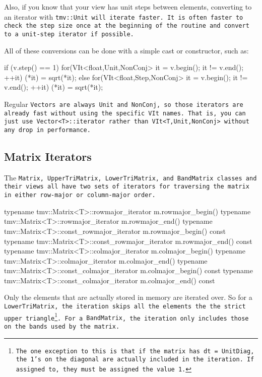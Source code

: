Also, if you know that your view has unit steps between elements, converting to 
an iterator with \tt{tmv::Unit} will iterate faster.  It is often faster to check
the step size once at the beginning of the routine and convert to a unit-step
iterator if possible.

All of these conversions can be done with a simple cast or constructor, such as:
\begin{tmvcode}
if (v.step() == 1) {
    for(VIt<float,Unit,NonConj> it = v.begin(); it != v.end(); ++it)
        (*it) = sqrt(*it);
} else {
    for(VIt<float,Step,NonConj> it = v.begin(); it != v.end(); ++it)
        (*it) = sqrt(*it);
}
\end{tmvcode}

Regular \tt{Vector}s are always \tt{Unit} and \tt{NonConj}, so those iterators
are already fast without using the specific \tt{VIt} names. 
That is, you can just use \tt{Vector<T>::iterator} rather than \tt{VIt<T,Unit,NonConj>}
without any drop in performance.

\subsection{Matrix Iterators}
\label{MatrixIterators}

The \tt{Matrix}, \tt{UpperTriMatrix}, \tt{LowerTriMatrix}, and \tt{BandMatrix}
classes and their views all have two sets of iterators for traversing the matrix 
in either row-major or column-major order.  
\begin{tmvcode}
typename tmv::Matrix<T>::rowmajor_iterator m.rowmajor_begin()
typename tmv::Matrix<T>::rowmajor_iterator m.rowmajor_end()
typename tmv::Matrix<T>::const_rowmajor_iterator m.rowmajor_begin() const
typename tmv::Matrix<T>::const_rowmajor_iterator m.rowmajor_end() const
typename tmv::Matrix<T>::colmajor_iterator m.colmajor_begin()
typename tmv::Matrix<T>::colmajor_iterator m.colmajor_end()
typename tmv::Matrix<T>::const_colmajor_iterator m.colmajor_begin() const
typename tmv::Matrix<T>::const_colmajor_iterator m.colmajor_end() const
\end{tmvcode}
Only the elements
that are actually stored in memory are iterated over.  So for a \tt{LowerTriMatrix}, the 
iteration skips all the elements the the strict upper triangle\footnote{
The one exception to this is that if the matrix has \tt{dt = UnitDiag}, the 1's on the diagonal
are actually included in the iteration.  If assigned to, they must be assigned the value 1.}.
For a \tt{BandMatrix}, the 
iteration only includes those on the bands used by the matrix.  

